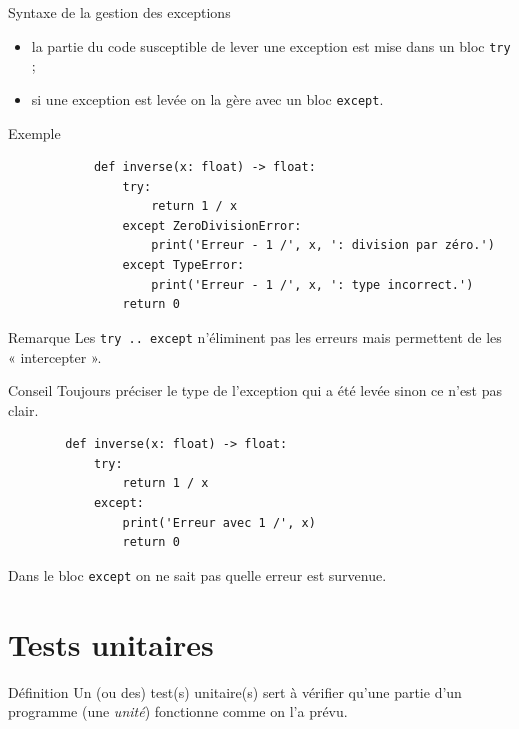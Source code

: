\documentclass[10pt]{nsibeamer}
\begin{document}
\begin{frame}[fragile]{Syntaxe de la gestion des exceptions}
    \pause
    \begin{itemize}
        \item   la partie du code susceptible de lever une exception est mise dans un bloc \texttt{try} ;\pause
        \item   si une exception est levée on la gère avec un bloc \texttt{except}.
    \end{itemize}
\end{frame}

\begin{frame}[fragile]{Exemple}
    \begin{verbatim}
            def inverse(x: float) -> float:
                try:
                    return 1 / x
                except ZeroDivisionError:
                    print('Erreur - 1 /', x, ': division par zéro.')
                except TypeError:
                    print('Erreur - 1 /', x, ': type incorrect.')
                return 0

        \end{verbatim}
\end{frame}

\begin{frame}[fragile]{Remarque}
    Les \texttt{try .. except} n'éliminent pas les erreurs mais permettent de les « intercepter ». 
\end{frame}

\begin{frame}[fragile]{Conseil}
    \pause
    Toujours préciser le type de l'exception qui a été levée sinon ce n'est pas clair.\pause
    
    \begin{verbatim}
        def inverse(x: float) -> float:
            try:
                return 1 / x
            except:
                print('Erreur avec 1 /', x)
                return 0    
    \end{verbatim}
    \pause
    Dans le bloc \texttt{except} on ne sait pas quelle erreur est survenue. 
\end{frame}


\section{Tests unitaires}
\begin{frame}[fragile]{Définition}
    Un (ou des) test(s) unitaire(s) sert à vérifier qu'une partie d'un programme (une \textit{unité}) fonctionne comme on l'a prévu.
\end{frame}
\end{document}

